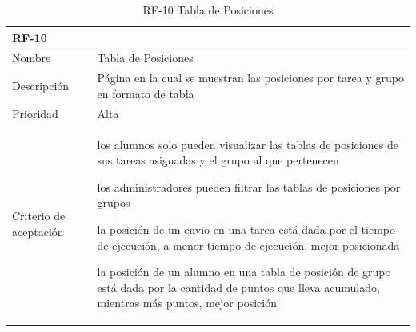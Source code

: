 \documentclass[11pt,spanish,listoffigures,listoftables]{tfgetsinf}
\begin{document}
\begin{table}[ht!]
	\centering
	\begin{tabular}{ |p{4cm}||p{10cm}|  }
		\multicolumn{2}{l}{\textbf{RF-10}} \\
		\hline
		Nombre & Tabla de Posiciones \\
		\hline
		Descripción & Página en la cual se muestran las posiciones por \gls{tarea} y \gls{grupo} en formato de tabla\\
		\hline
		Prioridad & Alta\\
		\hline
		Criterio de aceptación & 
		\begin{tabitem}
			\item los \gls{alumno}s solo pueden visualizar las tablas de posiciones de sus \gls{tarea}s asignadas y el \gls{grupo} al que pertenecen
			\item los \gls{administrador}es pueden filtrar las tablas de posiciones por \gls{grupo}s
			\item la posición de un \gls{envio} en una \gls{tarea} está dada por el tiempo de ejecución, a menor tiempo de ejecución, mejor posicionada
			\item la posición de un \gls{alumno} en una tabla de posición de \gls{grupo} está dada por la cantidad de puntos que lleva acumulado, mientras más puntos, mejor posición
		\end{tabitem} \\
		\hline
	\end{tabular}
	\caption{RF-10 Tabla de Posiciones}
	\label{table:10}
\end{table}
\end{document}
